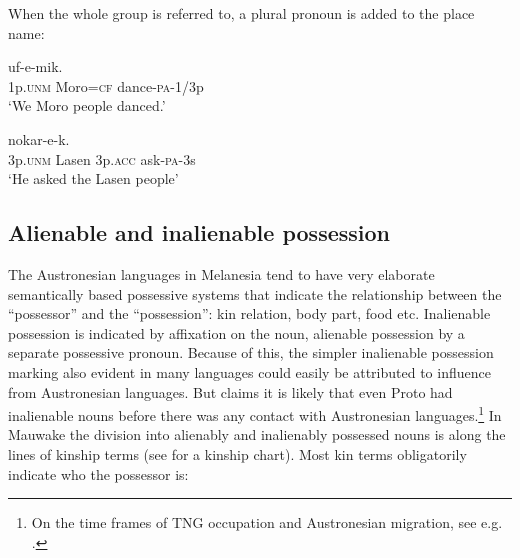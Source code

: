 When the whole group is referred to, a plural pronoun is added to the place name:

\ea%
\label{ex:x422}
\gll {}  uf-e-mik. \\
1p.\textsc{unm} Moro=\textsc{cf} dance-\textsc{pa}-1/3p\\
\glt`We Moro people danced.'
\z

\ea%
\label{ex:x423}
\gll {}   nokar-e-k.\footnotemark{} \\
3p.\textsc{unm} Lasen 3p.\textsc{acc} ask-\textsc{pa}-3s\\
\glt`He asked the Lasen people'
\z


\subsection{Alienable and inalienable possession}
{}
The Austronesian languages in Melanesia tend to have very elaborate semantically based possessive systems that indicate the relationship between the ``possessor'' and the ``possession'': kin relation, body part, food etc. Inalienable possession is indicated by affixation on the noun, alienable possession by a separate possessive pronoun. Because of this, the simpler inalienable possession marking also evident in many  languages could easily be attributed to influence from Austronesian languages. But \citet[28]{Ross1996} claims it is likely that even Proto  had inalienable nouns before there was any contact with Austronesian languages.\footnote{On the time frames of TNG occupation and Austronesian migration, see e.g. \citet[39--41]{Ross2005}.} In Mauwake the division into alienably and inalienably possessed nouns is along the lines of kinship terms (see  for a kinship chart). Most kin terms obligatorily indicate who the {\textquotedbl}possessor{\textquotedbl} is:

